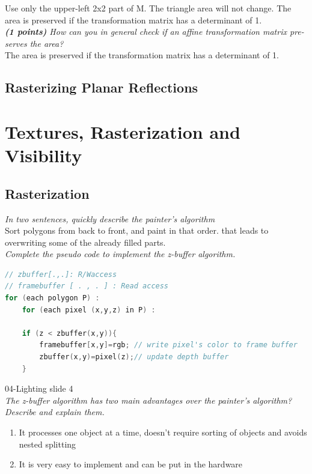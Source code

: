 \documentclass[a4paper,10pt]{article}
\begin{document}
Use only the upper-left 2x2 part of M. The triangle area will not change. The area is preserved if the transformation matrix has a determinant of 1.\\


\textit{\textbf{(1 points)} How can you in general check if an affine transformation matrix pre- serves the area?
}\\

The area is preserved if the transformation matrix has a determinant of 1.

\subsection{Rasterizing Planar Reflections}

\section{Textures, Rasterization and Visibility}
\subsection{Rasterization}
\textit{In two sentences, quickly describe the painter's algorithm}\\

Sort polygons from back to front, and paint in that order. that leads to overwriting some of the already
filled parts.\\

\textit{ Complete the pseudo code to implement the z-buffer algorithm.}\\

\begin{lstlisting}[language=C]
// zbuffer[.,.]: R/Waccess
// framebuffer [ . , . ] : Read access
for (each polygon P) :
	for (each pixel (x,y,z) in P) :

	if (z < zbuffer(x,y)){
		framebuffer[x,y]=rgb; // write pixel's color to frame buffer
		zbuffer(x,y)=pixel(z);// update depth buffer
	}
\end{lstlisting}
04-Lighting slide 4\\

\textit{The z-buffer algorithm has two main advantages over the painter’s algorithm? Describe and explain them.}
\begin{enumerate}
	\item It processes one object at a time, doesn’t require sorting of objects and avoids nested splitting
	\item It is very easy to implement and can be put in the hardware
\end{enumerate}
\end{document}
